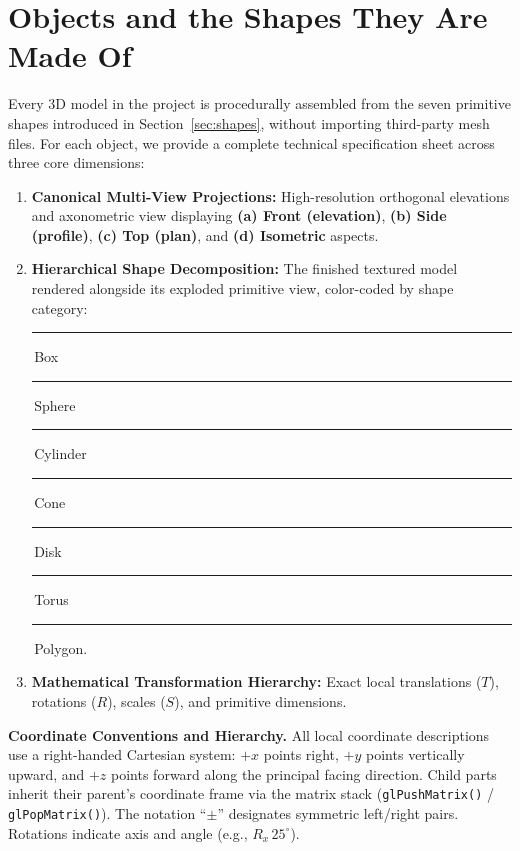 \documentclass[11pt,a4paper]{article}
\newcommand{\shape}[2]{\textcolor{#1}{\rule{0.8em}{0.8em}}\,#2}
\begin{document}
\clearpage
\section{Objects and the Shapes They Are Made Of}\label{sec:objects}
Every 3D model in the project is procedurally assembled from the seven primitive shapes introduced in Section~\ref{sec:shapes}, without importing third-party mesh files. For each object, we provide a complete technical specification sheet across three core dimensions:
\begin{enumerate}
  \item \textbf{Canonical Multi-View Projections:} High-resolution orthogonal elevations and axonometric view displaying \textbf{(a) Front (elevation)}, \textbf{(b) Side (profile)}, \textbf{(c) Top (plan)}, and \textbf{(d) Isometric} aspects.
  \item \textbf{Hierarchical Shape Decomposition:} The finished textured model rendered alongside its exploded primitive view, color-coded by shape category:
  \shape{cbox}{Box}\quad \shape{csphere}{Sphere}\quad \shape{ccyl}{Cylinder}\quad \shape{ccone}{Cone}\quad
  \shape{cdisk}{Disk}\quad \shape{ctorus}{Torus}\quad \shape{cpoly}{Polygon}.
  \item \textbf{Mathematical Transformation Hierarchy:} Exact local translations ($T$), rotations ($R$), scales ($S$), and primitive dimensions.
\end{enumerate}

\textbf{Coordinate Conventions and Hierarchy.} All local coordinate descriptions use a right-handed Cartesian system: $+x$ points right, $+y$ points vertically upward, and $+z$ points forward along the principal facing direction. Child parts inherit their parent's coordinate frame via the matrix stack (\texttt{glPushMatrix()} / \texttt{glPopMatrix()}). The notation ``$\pm$'' designates symmetric left/right pairs. Rotations indicate axis and angle (e.g., $R_x\,25^\circ$).
\end{document}
